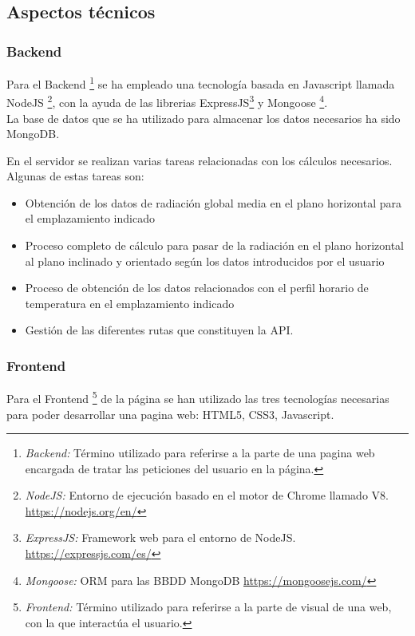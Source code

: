 \documentclass[11pt]{article}
\begin{document}
\subsection{Aspectos técnicos}

\subsubsection{Backend}

Para el Backend \footnote{\textit{Backend:} Término utilizado para referirse a la parte de una pagina web encargada de tratar las peticiones del usuario en la página.} se ha empleado una tecnología basada en Javascript llamada NodeJS \footnote{\textit{NodeJS:} Entorno de ejecución basado en el motor de Chrome llamado V8. \url{https://nodejs.org/en/} }, con la ayuda de las librerias ExpressJS\footnote{\textit{ExpressJS:} Framework web para el entorno de NodeJS. \url{https://expressjs.com/es/}} y Mongoose \footnote{\textit{Mongoose:} ORM para las BBDD MongoDB \url{https://mongoosejs.com/}}.   \\
La base de datos que se ha utilizado para almacenar los datos necesarios ha sido MongoDB.

En el servidor se realizan varias tareas relacionadas con los cálculos necesarios. Algunas de estas tareas son:
\begin{itemize}
\item Obtención de los datos de radiación global media en el plano horizontal para el emplazamiento indicado
\item Proceso completo de cálculo para pasar de la radiación en el plano horizontal al plano inclinado y orientado según los datos introducidos por el usuario
\item Proceso de obtención de los datos relacionados con el perfil horario de temperatura en el emplazamiento indicado
\item Gestión de las diferentes rutas que constituyen la API.
\end{itemize}

\subsubsection{Frontend}
 Para el Frontend \footnote{\textit{Frontend:} Término utilizado para referirse a la parte de visual de una web, con la que interactúa el usuario.} de la página se han utilizado las tres tecnologías necesarias para poder desarrollar una pagina web: HTML5, CSS3, Javascript.\\
 
\end{document}
